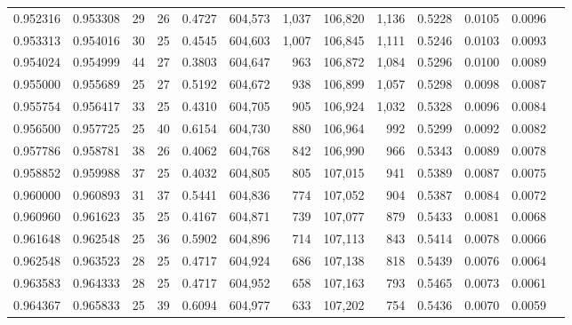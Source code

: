 \begin{tabular}{rrrrrrrrrrrrr}
0.952316 & 0.953308 &    29 &  26 &                                     0.4727 & 604,573 &   1,037 & 106,820 &   1,136 & 0.5228 & 0.0105 & 0.0096 \\
0.953313 & 0.954016 &    30 &  25 &                                     0.4545 & 604,603 &   1,007 & 106,845 &   1,111 & 0.5246 & 0.0103 & 0.0093 \\
0.954024 & 0.954999 &    44 &  27 &                                     0.3803 & 604,647 &     963 & 106,872 &   1,084 & 0.5296 & 0.0100 & 0.0089 \\
0.955000 & 0.955689 &    25 &  27 &                                     0.5192 & 604,672 &     938 & 106,899 &   1,057 & 0.5298 & 0.0098 & 0.0087 \\
0.955754 & 0.956417 &    33 &  25 &                                     0.4310 & 604,705 &     905 & 106,924 &   1,032 & 0.5328 & 0.0096 & 0.0084 \\
0.956500 & 0.957725 &    25 &  40 &                                     0.6154 & 604,730 &     880 & 106,964 &     992 & 0.5299 & 0.0092 & 0.0082 \\
0.957786 & 0.958781 &    38 &  26 &                                     0.4062 & 604,768 &     842 & 106,990 &     966 & 0.5343 & 0.0089 & 0.0078 \\
0.958852 & 0.959988 &    37 &  25 &                                     0.4032 & 604,805 &     805 & 107,015 &     941 & 0.5389 & 0.0087 & 0.0075 \\
0.960000 & 0.960893 &    31 &  37 &                                     0.5441 & 604,836 &     774 & 107,052 &     904 & 0.5387 & 0.0084 & 0.0072 \\
0.960960 & 0.961623 &    35 &  25 &                                     0.4167 & 604,871 &     739 & 107,077 &     879 & 0.5433 & 0.0081 & 0.0068 \\
0.961648 & 0.962548 &    25 &  36 &                                     0.5902 & 604,896 &     714 & 107,113 &     843 & 0.5414 & 0.0078 & 0.0066 \\
0.962548 & 0.963523 &    28 &  25 &                                     0.4717 & 604,924 &     686 & 107,138 &     818 & 0.5439 & 0.0076 & 0.0064 \\
0.963583 & 0.964333 &    28 &  25 &                                     0.4717 & 604,952 &     658 & 107,163 &     793 & 0.5465 & 0.0073 & 0.0061 \\
0.964367 & 0.965833 &    25 &  39 &                                     0.6094 & 604,977 &     633 & 107,202 &     754 & 0.5436 & 0.0070 & 0.0059 \\

\end{tabular}
